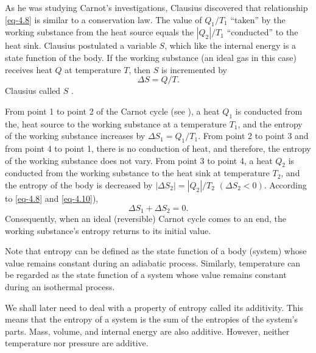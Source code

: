 As he was studying Carnot's investigations, Clausius discovered that relationship \eqref{eq-4.8} is similar to a conservation law. The value of $Q_{1}/T_{1}$ ``taken'' by the working substance from the heat source equals the  $|Q_{2}|/T_{1}$ ``conducted'' to the heat sink. Clausius postulated a variable $S$, which like the internal energy is a state function of the body. If the working substance (an ideal gas in this case) receives heat 
$Q$ at temperature $T$, then $S$ is incremented by
\begin{equation}%
\Delta S= Q/T.
\label{eq-4.10}
\end{equation}
Clausius called $S$ . 

From point 1 to point 2 of the Carnot cycle (see ), a heat $Q_{1}$ is conducted from the, heat source to the working substance at a temperature $T_{1}$, and the entropy of the working substance increases by $\Delta S_{1} = Q_{1}/T_{1}$. From	 point 2 to point 3	and from point 4 to point 1, there is no conduction of heat, and therefore, the entropy of the working substance does not vary. From point 3 to point 4, a heat $Q_{2}$ is conducted from the working substance to the heat sink at temperature $T_{2}$, and	the	entropy of the	body is decreased by	$| \Delta S_{2}| = |Q_{2}| /T_{2} \,\, (\Delta S_{2} < 0)$. According to \eqref{eq-4.8} and \eqref{eq-4.10}), 
\begin{equation}%
\Delta S_{1} + \Delta S_{2} = 0.
\label{eq-4.11}
\end{equation}
Consequently, when an ideal (reversible) Carnot cycle comes to an end, the working substance's entropy returns to its initial value. 

Note that entropy can be defined as the state function of a body (system) whose value remains constant during an adiabatic process. Similarly, temperature can be regarded as the state function of a system whose value remains constant during an isothermal process. 

We shall later need to deal with a property of entropy called its additivity. This means that the entropy of a system is the sum of the entropies of the system's parts. Mass, volume, and internal energy are also additive. However, neither temperature nor pressure are additive.

